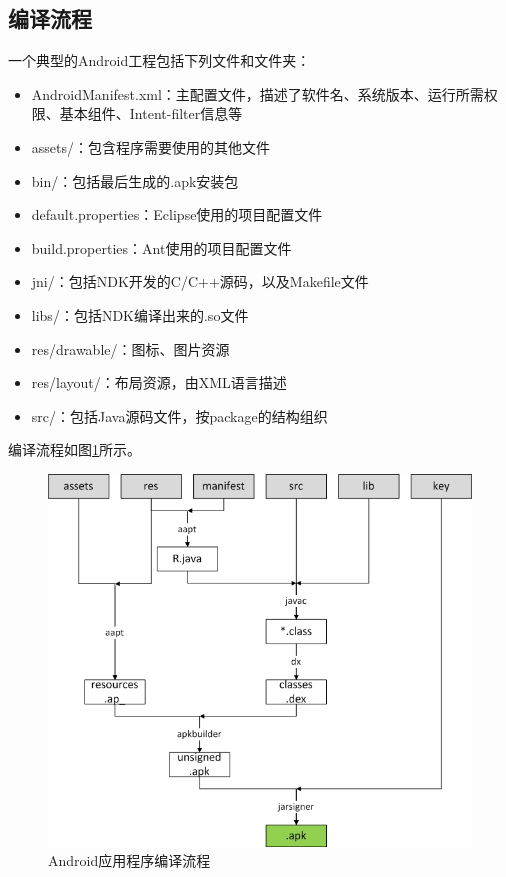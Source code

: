 \subsection{编译流程}
一个典型的Android工程包括下列文件和文件夹：
\begin{itemize}
	\item AndroidManifest.xml：主配置文件，描述了软件名、系统版本、运行所需权限、基本组件、Intent-filter信息等
	\item assets/：包含程序需要使用的其他文件
	\item bin/：包括最后生成的.apk安装包
	\item default.properties：Eclipse使用的项目配置文件
	\item build.properties：Ant使用的项目配置文件
	\item jni/：包括NDK开发的C/C++源码，以及Makefile文件
	\item libs/：包括NDK编译出来的.so文件
	\item res/drawable/：图标、图片资源
	\item res/layout/：布局资源，由XML语言描述
	\item src/：包括Java源码文件，按package的结构组织
\end{itemize}

编译流程如图\ref{Fig:compilation}所示。
\begin{figure}[htb]
  \centering
  \includegraphics[width=14cm]{image/compilation.jpg}
  \caption{Android应用程序编译流程}
  \label{Fig:compilation}
\end{figure}

